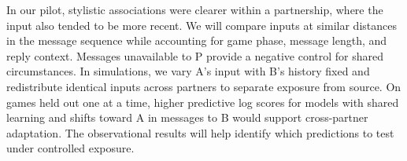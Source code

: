 \documentclass[sigconf,nonacm]{acmart}
\begin{document}
In our pilot, stylistic associations were clearer within a partnership, where the input also tended to be more recent. We will compare inputs at similar distances in the message sequence while accounting for game phase, message length, and reply context. Messages unavailable to P provide a negative control for shared circumstances. In simulations, we vary A's input with B's history fixed and redistribute identical inputs across partners to separate exposure from source. On games held out one at a time, higher predictive log scores for models with shared learning and shifts toward A in messages to B would support cross-partner adaptation. The observational results will help identify which predictions to test under controlled exposure.



\end{document}
